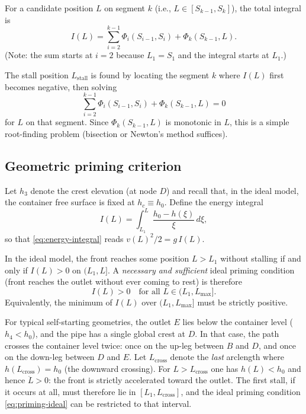 \documentclass[11pt]{article}
\theoremstyle{definition}
\begin{document}
For a candidate position $L$ on segment $k$ (i.e., $L \in [S_{k-1}, S_k]$), the total 
integral is
\begin{equation}
  I(L) = \sum_{i=2}^{k-1} \Phi_i(S_{i-1}, S_i) + \Phi_k(S_{k-1}, L).
  \label{eq:total-integral}
\end{equation}
(Note: the sum starts at $i = 2$ because $L_1 = S_1$ and the integral starts at $L_1$.)

The stall position $L_{\text{stall}}$ is found by locating the segment $k$ where $I(L)$ 
first becomes negative, then solving
\begin{equation}
  \sum_{i=2}^{k-1} \Phi_i(S_{i-1}, S_i) + \Phi_k(S_{k-1}, L) = 0
  \label{eq:stall-piecewise}
\end{equation}
for $L$ on that segment. Since $\Phi_k(S_{k-1}, L)$ is monotonic in $L$, this is a simple 
root-finding problem (bisection or Newton's method suffices).

\subsection{Geometric priming criterion}

Let $h_3$ denote the crest elevation (at node $D$) and recall that, in the ideal model, the
container free surface is fixed at $h_c \equiv h_0$. Define the energy integral
\begin{equation}
  I(L) = \int_{L_1}^{L} \frac{h_0 - h(\xi)}{\xi}\,d\xi,
  \label{eq:energy-integral-I}
\end{equation}
so that \eqref{eq:energy-integral} reads $v(L)^2/2 = g\,I(L)$.

In the ideal model, the front reaches some position $L > L_1$ without stalling if and only if
$I(L) > 0$ on $(L_1, L]$. A \emph{necessary and sufficient} ideal priming condition (front
reaches the outlet without ever coming to rest) is therefore
\begin{equation}
  I(L) > 0 \quad \text{for all } L \in (L_1, L_{\max}].
  \label{eq:priming-ideal}
\end{equation}
Equivalently, the minimum of $I(L)$ over $(L_1, L_{\max}]$ must be strictly positive.

For typical self-starting geometries, the outlet $E$ lies below the container level
($h_4 < h_0$), and the pipe has a single global crest at $D$. In that case, the path crosses
the container level twice: once on the up-leg between $B$ and $D$, and once on the down-leg
between $D$ and $E$. Let $L_{\text{cross}}$ denote the \emph{last} arclength where
$h(L_{\text{cross}}) = h_0$ (the downward crossing). For $L > L_{\text{cross}}$ one has
$h(L) < h_0$ and hence $\ddot{L} > 0$: the front is strictly accelerated toward the outlet.
The first stall, if it occurs at all, must therefore lie in $[L_1, L_{\text{cross}}]$, and the
ideal priming condition \eqref{eq:priming-ideal} can be restricted to that interval.
\end{document}
